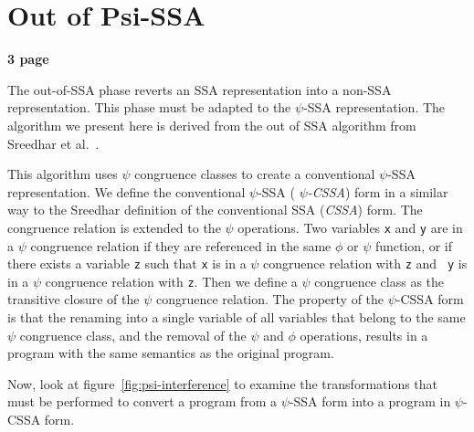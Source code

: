\section{Out of Psi-SSA}

\textbf{3 page}


The out-of-SSA phase reverts an SSA representation into a non-SSA
representation. This phase must be adapted to the $\psi$-SSA
representation. The algorithm we present here is derived from the out
of SSA algorithm from Sreedhar et al.~\cite{VC+99}.

This algorithm uses $\psi$ congruence classes to create a conventional
$\psi$-SSA representation. We define the conventional $\psi$-SSA ({\em
  $\psi$-CSSA}) form in a similar way to the Sreedhar definition of
the conventional SSA ({\em CSSA}) form. The congruence relation is
extended to the $\psi$ operations. Two variables {\tt x} and {\tt y}
are in a $\psi$ congruence relation if they are referenced in the same
$\phi$ or $\psi$ function, or if there exists a variable {\tt z} such
that {\tt x} is in a $\psi$ congruence relation with {\tt z} and {\tt
  y} is in a $\psi$ congruence relation with {\tt z}. Then we define a
$\psi$ congruence class as the transitive closure of the $\psi$
congruence relation. The property of the $\psi$-CSSA form is that the
renaming into a single variable of all variables that belong to the
same $\psi$ congruence class, and the removal of the $\psi$ and $\phi$
operations, results in a program with the same semantics as the
original program.

Now, look at figure~\ref{fig:psi-interference} to examine the
transformations that must be performed to convert a program from a
$\psi$-SSA form into a program in $\psi$-CSSA form.

